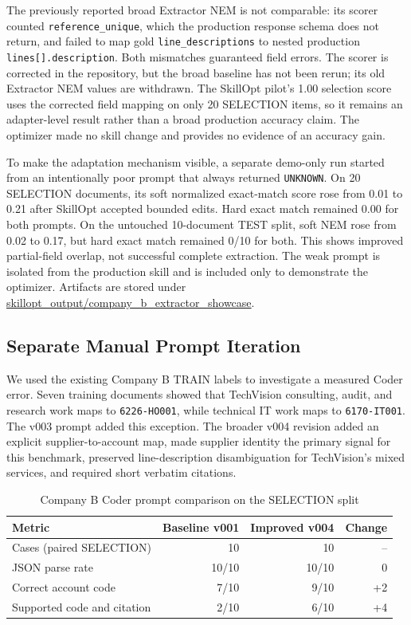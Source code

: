 The previously reported broad Extractor NEM is not comparable: its scorer
counted \texttt{reference\_unique}, which the production response schema does
not return, and failed to map gold \texttt{line\_descriptions} to nested
production \texttt{lines[].description}. Both mismatches guaranteed field
errors. The scorer is corrected in the repository, but the broad baseline has
not been rerun; its old Extractor NEM values are withdrawn. The SkillOpt pilot's
1.00 selection score uses the corrected field mapping on only 20 SELECTION items,
so it remains an adapter-level result rather than a broad production accuracy
claim. The optimizer made no skill change and provides no evidence of an
accuracy gain.

To make the adaptation mechanism visible, a separate demo-only run started from
an intentionally poor prompt that always returned \texttt{UNKNOWN}. On 20
SELECTION documents, its soft normalized exact-match score rose from 0.01 to
0.21 after SkillOpt accepted bounded edits. Hard exact match remained 0.00 for
both prompts. On the untouched 10-document TEST split, soft NEM rose from 0.02
to 0.17, but hard exact match remained 0/10 for both. This shows improved
partial-field overlap, not successful complete extraction. The weak prompt is
isolated from the production skill and is included only to demonstrate the
optimizer. Artifacts are stored under
\url{skillopt_output/company_b_extractor_showcase}.

\subsection{Separate Manual Prompt Iteration}

We used the existing Company B TRAIN labels to investigate a measured
Coder error. Seven training documents showed that TechVision consulting,
audit, and research work maps to \texttt{6226-HO001}, while technical IT work
maps to \texttt{6170-IT001}. The v003 prompt added this exception. The broader
v004 revision added an explicit supplier-to-account map, made supplier identity
the primary signal for this benchmark, preserved line-description
disambiguation for TechVision's mixed services, and required short verbatim
citations.

\begin{table}[ht]
\caption{Company B Coder prompt comparison on the SELECTION split}
\label{tab:skill_iteration}
\centering\scriptsize\renewcommand{\arraystretch}{1.2}
\begin{tabular}{@{}lrrr@{}}
\toprule
\textbf{Metric} & \textbf{Baseline v001} & \textbf{Improved v004} & \textbf{Change} \\
\midrule
Cases (paired SELECTION) & 10 & 10 & -- \\
JSON parse rate & 10/10 & 10/10 & 0 \\
Correct account code & 7/10 & 9/10 & +2 \\
Supported code and citation & 2/10 & 6/10 & +4 \\
\bottomrule
\end{tabular}
\end{table}

